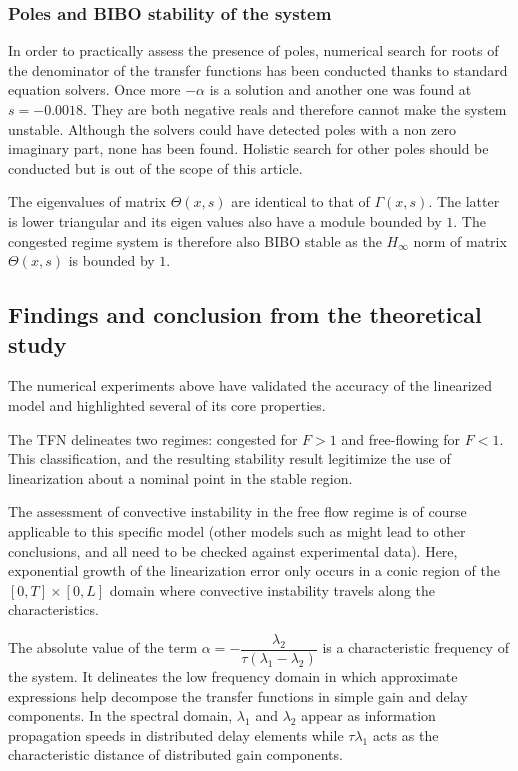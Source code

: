 \documentclass[5p,twocolumn]{elsarticle}
\begin{document}
\subsubsection{Poles and BIBO stability of the system}
In order to practically assess the presence of poles, numerical search for roots of the denominator of the transfer functions has been conducted thanks to standard equation solvers. Once more $-\alpha$ is a solution and another one was found at $s=-0.0018$. They are both negative reals and therefore cannot make the system unstable. Although the solvers could have detected poles with a non zero imaginary part, none has been found. Holistic search for other poles should be conducted but is out of the scope of this article.

The eigenvalues of matrix $\Theta(x,s)$ are identical to that of $\Gamma(x,s)$. The latter is lower triangular and its eigen values also have a module bounded by $1$. The congested regime system is therefore also BIBO stable as the $H_{\infty}$ norm of matrix $\Theta(x,s)$ is bounded by $1$.

\subsection{Findings and conclusion from the theoretical study}
The numerical experiments above have validated the accuracy of the linearized model and highlighted several of its core properties.

The TFN delineates two regimes: congested for $F > 1$ and free-flowing for $F < 1$. This classification, and the resulting stability result legitimize the use of linearization about a nominal point in the stable region.

The assessment of convective instability in the free flow regime is of course applicable to this specific model (other models such as \cite{Jamitons-multi-valued-fund} might lead to other conclusions, and all need to be checked against experimental data). Here, exponential growth of the linearization error only occurs in a conic region of the  $\left[0,T\right] \times \left[0,L\right]$ domain where convective instability travels along the characteristics.

The absolute value of the term $\alpha = -\dfrac{\lambda_2}{\tau(\lambda_1 - \lambda_2)}$ is a characteristic frequency of the system. It delineates the low frequency domain in which approximate expressions help decompose the transfer functions in simple gain and delay components. In the spectral domain, $\lambda_{1}$ and $\lambda_{2}$ appear as information propagation speeds in distributed delay elements while  $\tau\lambda_{1}$ acts as the characteristic distance of distributed gain components.
\end{document}
